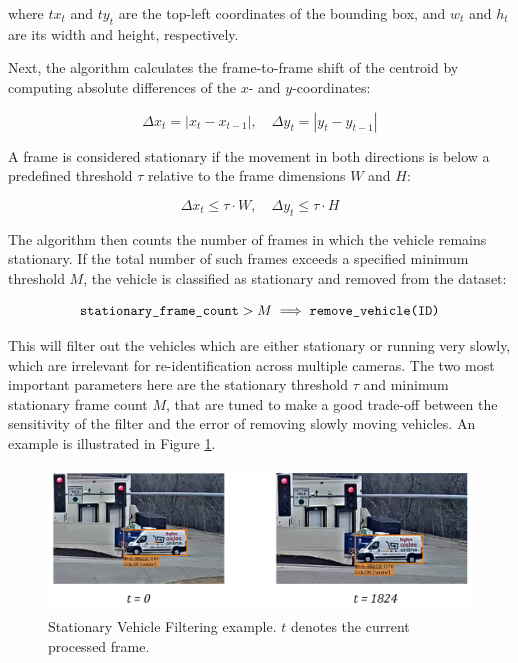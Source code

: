 where \(tx_t\) and \(ty_t\) are the top-left coordinates of the bounding box, and \(w_t\) and \(h_t\) are its width and height, respectively.

Next, the algorithm calculates the frame-to-frame shift of the centroid by computing absolute differences of the \(x\)- and \(y\)-coordinates:

\[
    \Delta x_t = |x_t - x_{t-1}|, \quad \Delta y_t = |y_t - y_{t-1}|
\]

A frame is considered stationary if the movement in both directions is below a predefined threshold \(\tau\) relative to the frame dimensions \(W\) and \(H\):

\[
    \Delta x_t \leq \tau \cdot W, \quad \Delta y_t \leq \tau \cdot H
\]

The algorithm then counts the number of frames in which the vehicle remains stationary. If the total number of such frames exceeds a specified minimum threshold \(M\), the vehicle is classified as stationary and removed from the dataset:

\[
    \verb|stationary_frame_count| > M \implies \verb|remove_vehicle(ID)|
\]

This will filter out the vehicles which are either stationary or running very slowly, which are irrelevant for re-identification across multiple cameras. The two most important parameters here are the stationary threshold \( \tau \) and minimum stationary frame count \( M \), that are tuned to make a good trade-off between the sensitivity of the filter and the error of removing slowly moving vehicles. An example is illustrated in Figure \ref{fig:StationaryFiltering}.

\begin{figure}[H]
    \centering
    \includegraphics[width=1.0\textwidth]{images/StationaryFiltering.png}
    \caption[Stationary Filtering]{Stationary Vehicle Filtering example. $t$ denotes the current processed frame.}
    \label{fig:StationaryFiltering}
\end{figure}

